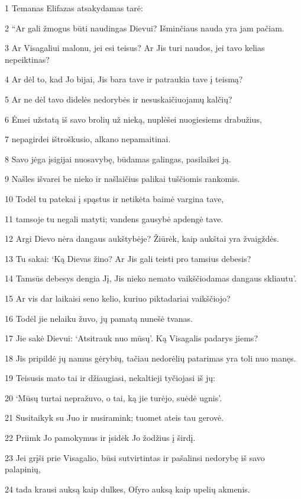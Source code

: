 \par 1 Temanas Elifazas atsakydamas tarė: 
\par 2 “Ar gali žmogus būti naudingas Dievui? Išminčiaus nauda yra jam pačiam. 
\par 3 Ar Visagaliui malonu, jei esi teisus? Ar Jis turi naudos, jei tavo kelias nepeiktinas? 
\par 4 Ar dėl to, kad Jo bijai, Jis bara tave ir patraukia tave į teismą? 
\par 5 Ar ne dėl tavo didelės nedorybės ir nesuskaičiuojamų kalčių? 
\par 6 Ėmei užstatą iš savo brolių už nieką, nuplėšei nuogiesiems drabužius, 
\par 7 nepagirdei ištroškusio, alkano nepamaitinai. 
\par 8 Savo jėga įsigijai nuosavybę, būdamas galingas, pasilaikei ją. 
\par 9 Našles išvarei be nieko ir našlaičius palikai tuščiomis rankomis. 
\par 10 Todėl tu patekai į spąstus ir netikėta baimė vargina tave, 
\par 11 tamsoje tu negali matyti; vandens gausybė apdengė tave. 
\par 12 Argi Dievo nėra dangaus aukštybėje? Žiūrėk, kaip aukštai yra žvaigždės. 
\par 13 Tu sakai: ‘Ką Dievas žino? Ar Jis gali teisti pro tamsius debesis? 
\par 14 Tamsūs debesys dengia Jį, Jis nieko nemato vaikščiodamas dangaus skliautu’. 
\par 15 Ar vis dar laikaisi seno kelio, kuriuo piktadariai vaikščiojo? 
\par 16 Todėl jie nelaiku žuvo, jų pamatą nunešė tvanas. 
\par 17 Jie sakė Dievui: ‘Atsitrauk nuo mūsų’. Ką Visagalis padarys jiems? 
\par 18 Jis pripildė jų namus gėrybių, tačiau nedorėlių patarimas yra toli nuo manęs. 
\par 19 Teisusis mato tai ir džiaugiasi, nekaltieji tyčiojasi iš jų: 
\par 20 ‘Mūsų turtai nepražuvo, o tai, ką jie turėjo, suėdė ugnis’. 
\par 21 Susitaikyk su Juo ir nusiramink; tuomet ateis tau gerovė. 
\par 22 Priimk Jo pamokymus ir įsidėk Jo žodžius į širdį. 
\par 23 Jei grįši prie Visagalio, būsi sutvirtintas ir pašalinsi nedorybę iš savo palapinių, 
\par 24 tada krausi auksą kaip dulkes, Ofyro auksą kaip upelių akmenis. 

